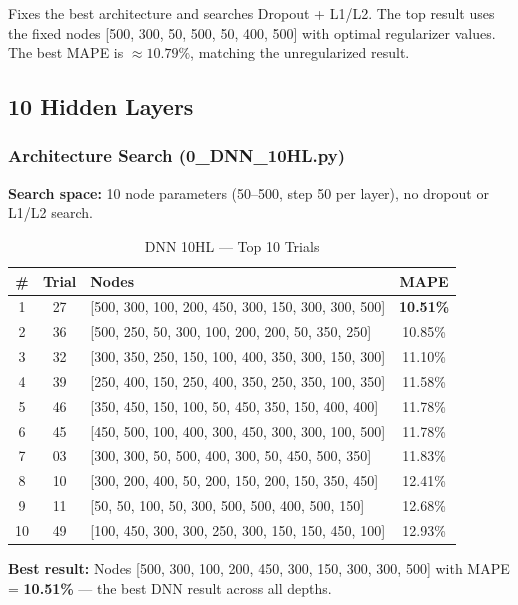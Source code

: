 \documentclass[11pt,a4paper]{article}
\begin{document}
Fixes the best architecture and searches Dropout + L1/L2. The top result uses the fixed nodes [500, 300, 50, 500, 50, 400, 500] with optimal regularizer values. The best MAPE is $\approx 10.79\%$, matching the unregularized result.

\subsection{10 Hidden Layers}

\subsubsection*{Architecture Search (0\_DNN\_10HL.py)}

\textbf{Search space:} 10 node parameters (50--500, step 50 per layer), no dropout or L1/L2 search.

\begin{table}[H]
\centering
\caption{DNN 10HL — Top 10 Trials}
\begin{tabular}{ccp{4.5cm}c}
\toprule
\textbf{\#} & \textbf{Trial} & \textbf{Nodes} & \textbf{MAPE} \\
\midrule
1 & 27 & [500, 300, 100, 200, 450, 300, 150, 300, 300, 500] & \textbf{10.51\%} \\
2 & 36 & [500, 250, 50, 300, 100, 200, 200, 50, 350, 250]   & 10.85\% \\
3 & 32 & [300, 350, 250, 150, 100, 400, 350, 300, 150, 300] & 11.10\% \\
4 & 39 & [250, 400, 150, 250, 400, 350, 250, 350, 100, 350] & 11.58\% \\
5 & 46 & [350, 450, 150, 100, 50, 450, 350, 150, 400, 400]  & 11.78\% \\
6 & 45 & [450, 500, 100, 400, 300, 450, 300, 300, 100, 500] & 11.78\% \\
7 & 03 & [300, 300, 50, 500, 400, 300, 50, 450, 500, 350]   & 11.83\% \\
8 & 10 & [300, 200, 400, 50, 200, 150, 200, 150, 350, 450]  & 12.41\% \\
9 & 11 & [50, 50, 100, 50, 300, 500, 500, 400, 500, 150]    & 12.68\% \\
10 & 49 & [100, 450, 300, 300, 250, 300, 150, 150, 450, 100] & 12.93\% \\
\bottomrule
\end{tabular}
\end{table}

\textbf{Best result:} Nodes [500, 300, 100, 200, 450, 300, 150, 300, 300, 500] with MAPE = \textbf{10.51\%} — the best DNN result across all depths.
\end{document}
